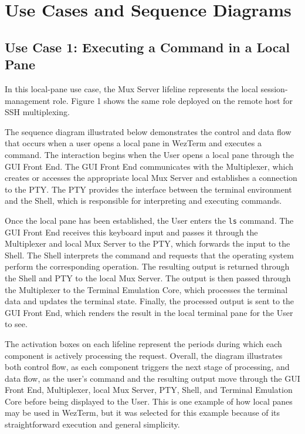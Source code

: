 \section{Use Cases and Sequence Diagrams}
\label{sec:use-cases}


\subsection{Use Case 1: Executing a Command in a Local Pane}

\label{sec:use-case-1}

In this local-pane use case, the Mux Server lifeline represents the local session-management role. Figure 1 shows the same role deployed on the remote host for SSH multiplexing.

The sequence diagram illustrated below demonstrates the control and data flow that occurs when a user opens a local pane in WezTerm and executes a command. The interaction begins when the User opens a local pane through the GUI Front End. The GUI Front End communicates with the Multiplexer, which creates or accesses the appropriate local Mux Server and establishes a connection to the PTY. The PTY provides the interface between the terminal environment and the Shell, which is responsible for interpreting and executing commands.

Once the local pane has been established, the User enters the \texttt{ls} command. The GUI Front End receives this keyboard input and passes it through the Multiplexer and local Mux Server to the PTY, which forwards the input to the Shell. The Shell interprets the command and requests that the operating system perform the corresponding operation. The resulting output is returned through the Shell and PTY to the local Mux Server. The output is then passed through the Multiplexer to the Terminal Emulation Core, which processes the terminal data and updates the terminal state. Finally, the processed output is sent to the GUI Front End, which renders the result in the local terminal pane for the User to see.

The activation boxes on each lifeline represent the periods during which each component is actively processing the request. Overall, the diagram illustrates both control flow, as each component triggers the next stage of processing, and data flow, as the user's command and the resulting output move through the GUI Front End, Multiplexer, local Mux Server, PTY, Shell, and Terminal Emulation Core before being displayed to the User. This is one example of how local panes may be used in WezTerm, but it was selected for this example because of its straightforward execution and general simplicity.

